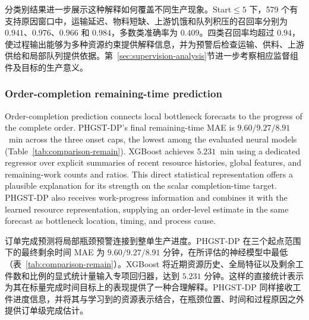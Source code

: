 \documentclass[a4paper,fleqn]{cas-dc}
\newcommand{\zhpara}[1]{%
  \par\begingroup\small\color{black!72}\noindent #1\par\endgroup}
\begin{document}
\zhpara{分类别结果进一步展示这种解释如何覆盖不同生产现象。Start$\leq5$ 下，579 个有支持原因窗口中，运输延迟、物料短缺、上游饥饿和队列积压的召回率分别为 $0.941$、$0.976$、$0.966$ 和 $0.984$，多数类准确率为 $0.409$。四类召回率均超过 $0.94$，使过程输出能够为多种资源约束提供解释信息，并为预警后检查运输、供料、上游供给和局部队列提供依据。第~\ref{sec:supervision-analysis}节进一步考察相应监督组件及目标的生产意义。}

\subsubsection{Order-completion remaining-time prediction}\label{sec:comparison-remain}

Order-completion prediction connects local bottleneck forecasts to the progress of the complete order. PHGST-DP's final remaining-time MAE is $9.60/9.27/8.91$~min across the three onset caps, the lowest among the evaluated neural models (Table~\ref{tab:comparison-remain}). XGBoost achieves $5.231$~min using a dedicated regressor over explicit summaries of recent resource histories, global features, and remaining-work counts and ratios. This direct statistical representation offers a plausible explanation for its strength on the scalar completion-time target. PHGST-DP also receives work-progress information and combines it with the learned resource representation, supplying an order-level estimate in the same forecast as bottleneck location, timing, and process cause.

\zhpara{订单完成预测将局部瓶颈预警连接到整单生产进度。PHGST-DP 在三个起点范围下的最终剩余时间 MAE 为 $9.60/9.27/8.91$ 分钟，在所评估的神经模型中最低（表~\ref{tab:comparison-remain}）。XGBoost 将近期资源历史、全局特征以及剩余工件数和比例的显式统计量输入专项回归器，达到 $5.231$ 分钟。这样的直接统计表示为其在标量完成时间目标上的表现提供了一种合理解释。PHGST-DP 同样接收工件进度信息，并将其与学习到的资源表示结合，在瓶颈位置、时间和过程原因之外提供订单级完成估计。}
\end{document}
